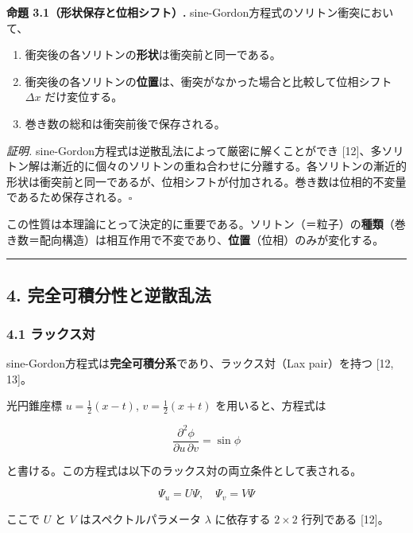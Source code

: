 \documentclass[a4paper,11pt]{ltjsarticle}
\providecommand{\tightlist}{\setlength{\itemsep}{0pt}\setlength{\parskip}{0pt}}
\begin{document}
\textbf{命題 3.1（形状保存と位相シフト）.}
sine-Gordon方程式のソリトン衝突において、

\begin{enumerate}
\def\labelenumi{\arabic{enumi}.}
\tightlist
\item
  衝突後の各ソリトンの\textbf{形状}は衝突前と同一である。
\item
  衝突後の各ソリトンの\textbf{位置}は、衝突がなかった場合と比較して位相シフト
  \(\Delta x\) だけ変位する。
\item
  巻き数の総和は衝突前後で保存される。
\end{enumerate}

\emph{証明.} sine-Gordon方程式は逆散乱法によって厳密に解くことができ
{[}12{]}、多ソリトン解は漸近的に個々のソリトンの重ね合わせに分離する。各ソリトンの漸近的形状は衝突前と同一であるが、位相シフトが付加される。巻き数は位相的不変量であるため保存される。\(\square\)

この性質は本理論にとって決定的に重要である。ソリトン（＝粒子）の\textbf{種類}（巻き数＝配向構造）は相互作用で不変であり、\textbf{位置}（位相）のみが変化する。

\begin{center}\rule{0.5\linewidth}{0.5pt}\end{center}

\subsection{4.
完全可積分性と逆散乱法}\label{ux5b8cux5168ux53efux7a4dux5206ux6027ux3068ux9006ux6563ux4e71ux6cd5}

\subsubsection{4.1 ラックス対}\label{ux30e9ux30c3ux30afux30b9ux5bfe}

sine-Gordon方程式は\textbf{完全可積分系}であり、ラックス対（Lax
pair）を持つ {[}12, 13{]}。

光円錐座標 \(u = \frac{1}{2}(x - t)\), \(v = \frac{1}{2}(x + t)\)
を用いると、方程式は

\[\frac{\partial^2 \phi}{\partial u\,\partial v} = \sin\phi\]

と書ける。この方程式は以下のラックス対の両立条件として表される。

\[\Psi_u = U\Psi, \quad \Psi_v = V\Psi\]

ここで \(U\) と \(V\) はスペクトルパラメータ \(\lambda\) に依存する
\(2 \times 2\) 行列である {[}12{]}。
\end{document}
